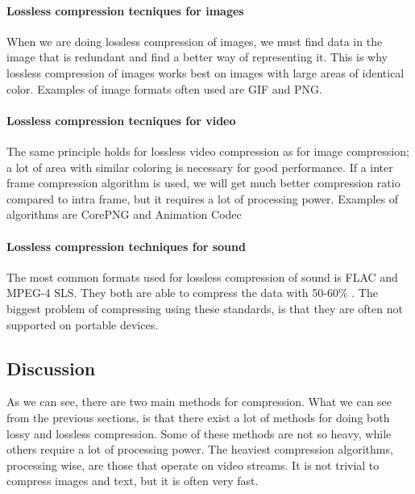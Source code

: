 \paragraph{Lossless compression tecniques for images}  \hfill \newline
When we are doing lossless compression of images, we must find data in the image that is redundant and find a better way of representing it. This is why lossless compression of images works best on images with large areas of identical color. Examples of image formats often used are GIF and PNG. \cite{bib:GIF} \cite{bib:gifSicle} \cite{bib:PNG}

\paragraph{Lossless compression tecniques for video}  \hfill \newline
The same principle holds for lossless video compression as for image compression; a lot of area with similar coloring is necessary for good performance. If a inter frame compression algorithm is used, we will get much better compression ratio compared to intra frame, but it requires a lot of processing power. Examples of algorithms are CorePNG and Animation Codec \cite{bib:corePNG} \cite{bib:animationCodec}


\paragraph{Lossless compression techniques for sound}
The most common formats used for lossless compression of sound is FLAC and MPEG-4 SLS. They both are able to compress the data with 50-60\% . The biggest problem of compressing using these standards, is that they are often not supported on portable devices.  \cite{bib:FLAC}

\subsection{Discussion}
As we can see, there are two main methods for compression. What we can see from the previous sections, is that there exist a lot of methods for doing both lossy and lossless compression. Some of these methods are not so heavy, while others require a lot of processing power. The heaviest compression algorithms, processing wise, are those that operate on video streams. It is not trivial to compress images and text, but it is often very fast.

